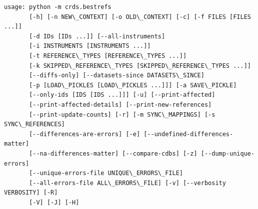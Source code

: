 \documentclass[letterpaper,10pt,english]{sphinxmanual}
\begin{document}
\begin{Verbatim}[commandchars=\\\{\}]
usage: python -m crds.bestrefs
       [-h] [-n NEW\_CONTEXT] [-o OLD\_CONTEXT] [-c] [-f FILES [FILES ...]]
       [-d IDs [IDs ...]] [--all-instruments]
       [-i INSTRUMENTS [INSTRUMENTS ...]]
       [-t REFERENCE\_TYPES [REFERENCE\_TYPES ...]]
       [-k SKIPPED\_REFERENCE\_TYPES [SKIPPED\_REFERENCE\_TYPES ...]]
       [--diffs-only] [--datasets-since DATASETS\_SINCE]
       [-p [LOAD\_PICKLES [LOAD\_PICKLES ...]]] [-a SAVE\_PICKLE]
       [--only-ids [IDS [IDS ...]]] [-u] [--print-affected]
       [--print-affected-details] [--print-new-references]
       [--print-update-counts] [-r] [-m SYNC\_MAPPINGS] [-s SYNC\_REFERENCES]
       [--differences-are-errors] [-e] [--undefined-differences-matter]
       [--na-differences-matter] [--compare-cdbs] [-z] [--dump-unique-errors]
       [--unique-errors-file UNIQUE\_ERRORS\_FILE]
       [--all-errors-file ALL\_ERRORS\_FILE] [-v] [--verbosity VERBOSITY] [-R]
       [-V] [-J] [-H]
\end{Verbatim}
\end{document}

